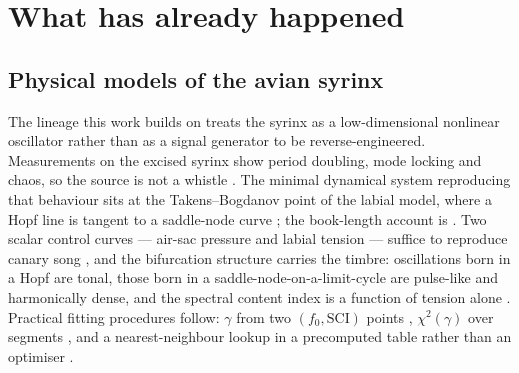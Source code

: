 \documentclass[10pt,twocolumn,a4paper]{article}
\begin{document}
\section{What has already happened}
\label{sec:prior}

\subsection{Physical models of the avian syrinx}

The lineage this work builds on treats the syrinx as a low-dimensional nonlinear
oscillator rather than as a signal generator to be reverse-engineered. Measurements on the
excised syrinx show period doubling, mode locking and chaos, so the source is not a
whistle \citep{fee1998}. The minimal dynamical system reproducing that behaviour sits at
the Takens--Bogdanov point of the labial model, where a Hopf line is tangent to a
saddle-node curve \citep{laje2002a,laje2002b}; the book-length account is
\citet{mindlin2005}. Two scalar control curves --- air-sac pressure and labial tension ---
suffice to reproduce canary song \citep{gardner2001}, and the bifurcation structure
carries the timbre: oscillations born in a Hopf are tonal, those born in a
saddle-node-on-a-limit-cycle are pulse-like and harmonically dense, and the spectral
content index is a function of tension alone \citep{sitt2008,amador2008}. Practical fitting
procedures follow: $\gamma$ from two $(f_0, \mathrm{SCI})$ points \citep{sitt2010},
$\chi^2(\gamma)$ over segments \citep{perl2011}, and a nearest-neighbour lookup in a
precomputed table rather than an optimiser \citep{boari2015}.
\end{document}
